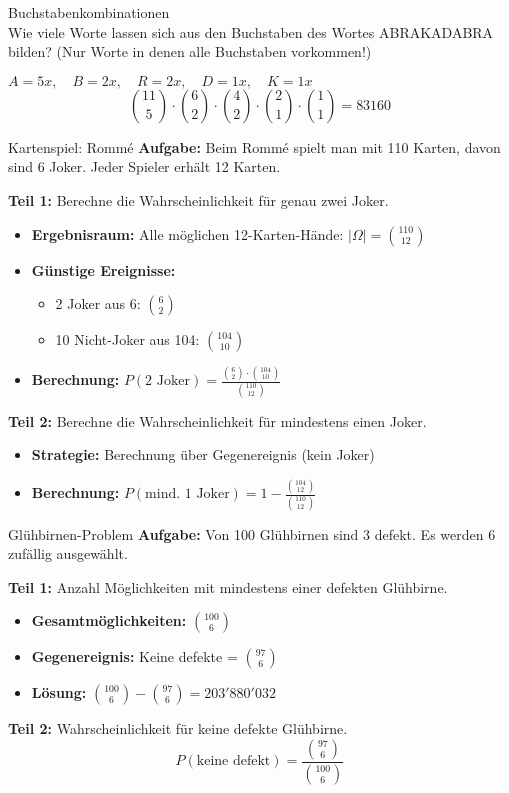 \begin{example2}{Buchstabenkombinationen}\\
Wie viele Worte lassen sich aus den Buchstaben des Wortes ABRAKADABRA bilden? (Nur Worte in denen alle Buchstaben vorkommen!)

$A = 5x, \quad B = 2x, \quad R = 2x, \quad D = 1x, \quad K = 1x$
$$\binom{11}{5} \cdot \binom{6}{2} \cdot \binom{4}{2} \cdot \binom{2}{1} \cdot \binom{1}{1} = 83160$$
\end{example2}

\begin{example2}{Kartenspiel: Rommé}
\textbf{Aufgabe:} Beim Rommé spielt man mit 110 Karten, davon sind 6 Joker. Jeder Spieler erhält 12 Karten.

\textbf{Teil 1:} Berechne die Wahrscheinlichkeit für genau zwei Joker.
\begin{itemize}
\item \textbf{Ergebnisraum:} Alle möglichen 12-Karten-Hände: $|\Omega| = \binom{110}{12}$
\item \textbf{Günstige Ereignisse:}
    \begin{itemize}
    \item 2 Joker aus 6: $\binom{6}{2}$
    \item 10 Nicht-Joker aus 104: $\binom{104}{10}$
    \end{itemize}
\item \textbf{Berechnung:} $P(\text{2 Joker}) = \frac{\binom{6}{2} \cdot \binom{104}{10}}{\binom{110}{12}}$
\end{itemize}

\textbf{Teil 2:} Berechne die Wahrscheinlichkeit für mindestens einen Joker.
\begin{itemize}
\item \textbf{Strategie:} Berechnung über Gegenereignis (kein Joker)
\item \textbf{Berechnung:} $P(\text{mind. 1 Joker}) = 1 - \frac{\binom{104}{12}}{\binom{110}{12}}$
\end{itemize}
\end{example2}

\begin{example2}{Glühbirnen-Problem}
\textbf{Aufgabe:} Von 100 Glühbirnen sind 3 defekt. Es werden 6 zufällig ausgewählt.

\textbf{Teil 1:} Anzahl Möglichkeiten mit mindestens einer defekten Glühbirne.
\begin{itemize}
\item \textbf{Gesamtmöglichkeiten:} $\binom{100}{6}$
\item \textbf{Gegenereignis:} Keine defekte = $\binom{97}{6}$
\item \textbf{Lösung:} $\binom{100}{6} - \binom{97}{6} = 203'880'032$
\end{itemize}

\textbf{Teil 2:} Wahrscheinlichkeit für keine defekte Glühbirne.
$$P(\text{keine defekt}) = \frac{\binom{97}{6}}{\binom{100}{6}}$$
\end{example2}
